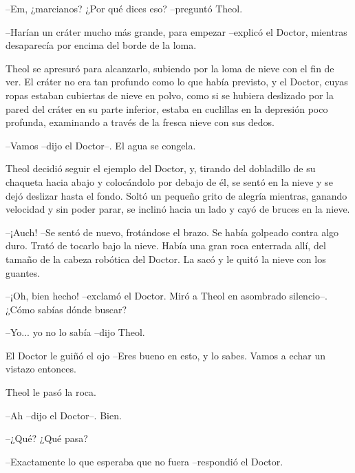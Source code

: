 --Em, ¿marcianos? ¿Por qué dices eso? --preguntó Theol.



--Harían un cráter mucho más grande, para empezar --explicó el Doctor, mientras desaparecía por encima del borde de la loma.



Theol se apresuró para alcanzarlo, subiendo por la loma de nieve con el fin de ver. El cráter no era tan profundo como lo que había previsto, y el Doctor, cuyas ropas estaban cubiertas de nieve en polvo, como si se hubiera deslizado por la pared del cráter en su parte inferior, estaba en cuclillas en la depresión poco profunda, examinando a través de la fresca nieve con sus dedos.



--Vamos --dijo el Doctor--. El agua se congela.



Theol decidió seguir el ejemplo del Doctor, y, tirando del dobladillo de su chaqueta hacia abajo y colocándolo por debajo de él, se sentó en la nieve y se dejó deslizar hasta el fondo. Soltó un pequeño grito de alegría mientras, ganando velocidad y sin poder parar, se inclinó hacia un lado y cayó de bruces en la nieve.



--¡Auch! --Se sentó de nuevo, frotándose el brazo. Se había golpeado contra algo duro. Trató de tocarlo bajo la nieve. Había una gran roca enterrada allí, del tamaño de la cabeza robótica del Doctor. La sacó y le quitó la nieve con los guantes.



--¡Oh, bien hecho! --exclamó el Doctor. Miró a Theol en asombrado silencio--. ¿Cómo sabías dónde buscar?



--Yo... yo no lo sabía --dijo Theol.



El Doctor le guiñó el ojo --Eres bueno en esto, y lo sabes. Vamos a echar un vistazo entonces.



Theol le pasó la roca.



--Ah --dijo el Doctor--. Bien.



--¿Qué? ¿Qué pasa?



--Exactamente lo que esperaba que no fuera --respondió el Doctor.



